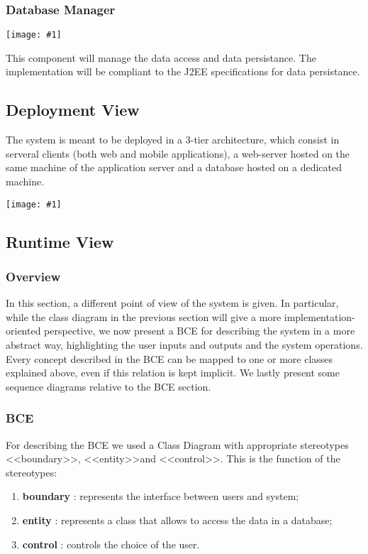 \documentclass[11pt, a4paper,titlepage]{article}
\newcommand{\image}[1]{
	\begin{center}
		\noindent \texttt{[image: \#1]}
	\end{center}
	}
\begin{document}
 \subsubsection{Database Manager} 
	\image{diagram_class_database.png}
 This component will manage the data access and data persistance. The implementation will be compliant to the J2EE specifications for data persistance.
	
\subsection{Deployment View}
The system is meant to be deployed in a 3-tier architecture, which consist in serveral clients (both web and mobile applications), a web-server hosted on the same machine of the application server and a database hosted on a dedicated machine.
\image{diagram_deployment.png}


\subsection{Runtime View}
\subsubsection{Overview}
In this section, a different point of view of the system is given. In particular, while the class diagram in the previous section will give a more implementation-oriented perspective, we now present a BCE for describing the system in a more abstract way, highlighting the user inputs and outputs and the system operations. Every concept described in the BCE can be mapped to one or more classes explained above, even if this relation is kept implicit.
We lastly present some sequence diagrams relative to the BCE section.

\subsubsection{BCE}
For describing the BCE we used a Class Diagram with appropriate stereotypes \textless \textless boundary\textgreater \textgreater , \textless \textless entity\textgreater \textgreater  and \textless \textless control\textgreater \textgreater.
This is the function of the stereotypes:
\begin{enumerate}
	\item 	\textbf{boundary} : represents the interface between users and system;
	\item 	\textbf{entity} : represents a class that allows to access the data in a database;
	\item 	\textbf{control} : controls the choice of the user.
\end{enumerate}
\end{document}
